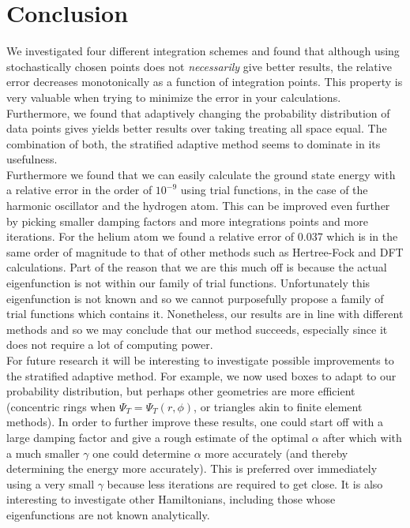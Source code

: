 
\section{Conclusion}
We investigated four different integration schemes and found that although using stochastically chosen points does not \textit{necessarily} give better results, the relative error decreases monotonically as a function of integration points. This property is very valuable when trying to minimize the error in your calculations. Furthermore, we found that adaptively changing the probability distribution of data points gives yields better results over taking treating all space equal. The combination of both, the stratified adaptive method seems to dominate in its usefulness. \\

Furthermore we found that we can easily calculate the ground state energy with a relative error in the order of $10^{-9}$ using trial functions, in the case of the harmonic oscillator and the hydrogen atom. This can be improved even further by picking smaller damping factors and more integrations points and more iterations.  For the helium atom we found a relative error of 0.037 which is in the same order of magnitude to that of other methods such as Hertree-Fock and DFT calculations. Part of the reason that we are this much off is because the actual eigenfunction is not within our family of trial functions. Unfortunately this eigenfunction is not known and so we cannot purposefully propose a family of trial functions which contains it. Nonetheless, our results are in line with different methods and so we may conclude that our method succeeds, especially since it does not require a lot of computing power. \\


For future research it will be interesting to investigate possible improvements to the stratified adaptive method. For example, we now used boxes to adapt to our probability distribution, but perhaps other geometries are more efficient (concentric rings when $\Psi_T = \Psi_T(r, \phi)$, or triangles akin to finite element methods). In order to further improve these results, one could start off with a large damping factor and give a rough estimate of the optimal $\alpha$ after which with a much smaller $\gamma$ one could determine $\alpha$ more accurately (and thereby determining the energy more accurately). This is preferred over immediately using a very small $\gamma$ because less iterations are required to get close. It is also interesting to investigate other Hamiltonians, including those whose eigenfunctions are not known analytically.
